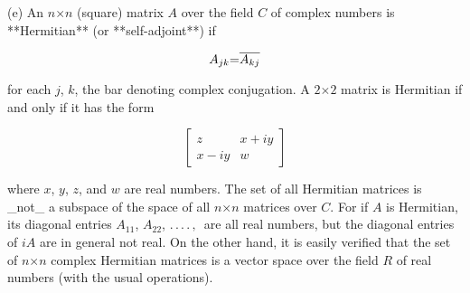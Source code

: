 (e) An \(n\)\(\times\)\(n\) (square) matrix \(A\) over the field \(C\) of complex numbers is **Hermitian** (or **self-adjoint**) if

\[A_{jk}\)\(=\)\(\overline{A_{kj}}\]

for each \(j\), \(k\), the bar denoting complex conjugation. A \(2\)\(\times\)\(2\) matrix is Hermitian if and only if it has the form

\[\left[\begin{matrix}z&x+iy\\ x-iy&w\end{matrix}\right]\]

where \(x\), \(y\), \(z\), and \(w\) are real numbers. The set of all Hermitian matrices is _not_ a subspace of the space of all \(n\)\(\times\)\(n\) matrices over \(C\). For if \(A\) is Hermitian, its diagonal entries \(A\)\({}_{11}\), \(A\)\({}_{22}\), \(.\,.\,.\,.\,,\,\) are all real numbers, but the diagonal entries of \(iA\) are in general not real. On the other hand, it is easily verified that the set of \(n\)\(\times\)\(n\) complex Hermitian matrices is a vector space over the field \(R\) of real numbers (with the usual operations).

